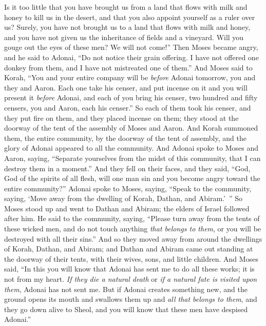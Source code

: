 \begin{biblechapter}
\verse Is it too little that you have brought us from a land that flows with milk and honey to kill us in the desert, and that you also appoint yourself as a ruler over us?
\verse Surely, you have not brought us to a land that flows with milk and honey, and you have not given us the inheritance of fields and a vineyard. Will you gouge out the eyes of these men? We will not come!”
\verse Then Moses became angry, and he said to Adonai, “Do not notice their grain offering. I have not offered one donkey from them, and I have not mistreated one of them.”
\verse And Moses said to Korah, “You and your entire company will be \textit{before} Adonai tomorrow, you and they and Aaron.
\verse Each one take his censer, and put incense on it and you will present it \textit{before} Adonai, and each of you bring his censer, two hundred and fifty censers, you and Aaron, each his censer.”
\verse So each of them took his censer, and they put fire on them, and they placed incense on them; they stood at the doorway of the tent of the assembly of Moses and Aaron.
\verse And Korah summoned them, the entire community, by the doorway of the tent of assembly, and the glory of Adonai appeared to all the community.
\verse And Adonai spoke to Moses and Aaron, saying,
\verse “Separate yourselves from the midst of this community, that I can destroy them in a moment.”
\verse And they fell on their faces, and they said, “God, God of the spirits of all flesh, will one man sin and you become angry toward the entire community?”
\verse Adonai spoke to Moses, saying,
\verse “Speak to the community, saying, ‘Move away from the dwelling of Korah, Dathan, and Abiram.’ ”
\verse So Moses stood up and went to Dathan and Abiram; the elders of Israel followed after him.
\verse He said to the community, saying, “Please turn away from the tents of these wicked men, and do not touch anything \textit{that belongs to them}, or you will be destroyed with all their sins.”
\verse And so they moved away from around the dwellings of Korah, Dathan, and Abiram; and Dathan and Abiram came out standing at the doorway of their tents, with their wives, sons, and little children.
\verse And Moses said, “In this you will know that Adonai has sent me to do all these works; it is not from my heart.
\verse \textit{If they die a natural death} or \textit{if a natural fate is visited upon them}, Adonai has not sent me.
\verse But if Adonai creates something new, and the ground opens its mouth and swallows them up and \textit{all that belongs to them}, and they go down alive to Sheol, and you will know that these men have despised Adonai.”

\end{biblechapter}
